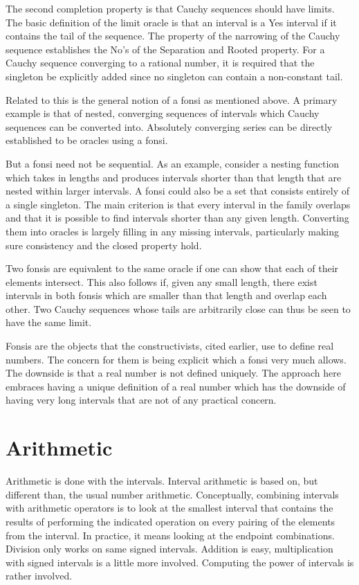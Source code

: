 \documentclass[12pt]{article}
\theoremstyle{remark}
\begin{document}
The second completion property is that Cauchy sequences should have limits. The basic definition of the limit oracle is that an interval is a Yes interval if it contains the tail of the sequence. The property of the narrowing of the Cauchy sequence establishes the No's of the Separation and Rooted property. For a Cauchy sequence converging to a rational number, it is required that the singleton be explicitly added since no singleton can contain a non-constant tail.

Related to this is the general notion of a fonsi as mentioned above. A primary example is that of nested, converging sequences of intervals which Cauchy sequences can be converted into. Absolutely converging series can be directly established to be oracles using a fonsi. 

But a fonsi need not be sequential. As an example, consider a nesting function which takes in lengths and produces intervals shorter than that length that are nested within larger intervals. A fonsi could also be a set that consists entirely of a single singleton. The main criterion is that every interval in the family overlaps and that it is possible to find intervals shorter than any given length. Converting them into oracles is largely filling in any missing intervals, particularly making sure consistency and the closed property hold.  

Two fonsis are equivalent to the same oracle if one can show that each of their elements intersect. This also follows if, given any small length, there exist intervals in both fonsis which are smaller than that length and overlap each other. Two Cauchy sequences whose tails are arbitrarily close can thus be seen to have the same limit. 

Fonsis are the objects that the constructivists, cited earlier, use to define real numbers. The concern for them is being explicit which a fonsi very much allows. The downside is that a real number is not defined uniquely. The approach here embraces having a unique definition of a real number which has the downside of having very long intervals that are not of any practical concern. 

\section{Arithmetic}

Arithmetic is done with the intervals. Interval arithmetic is based on, but different than, the usual number arithmetic. Conceptually, combining intervals with arithmetic operators is to look at the smallest interval that contains the results of performing the indicated operation on every pairing of the elements from the interval. In practice, it means looking at the endpoint combinations. Division only works on same signed intervals. Addition is easy, multiplication with signed intervals is a little more involved. Computing the power of intervals is rather involved. 
\end{document}
